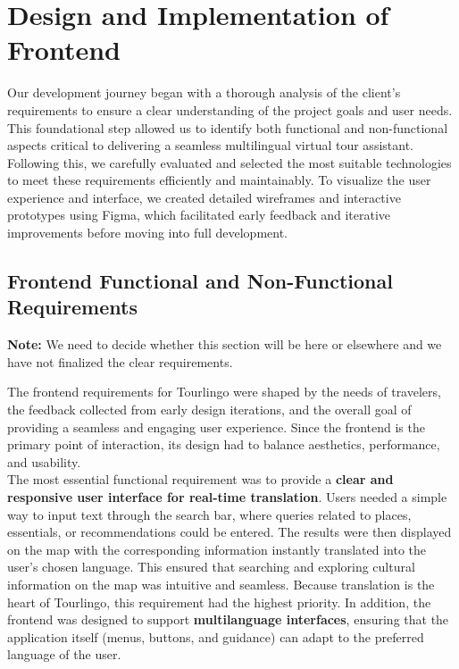 \section{Design and Implementation of Frontend}

Our development journey began with a thorough analysis of the client’s requirements to ensure a clear understanding of the project goals and user needs. This foundational step allowed us to identify both functional and non-functional aspects critical to delivering a seamless multilingual virtual tour assistant. Following this, we carefully evaluated and selected the most suitable technologies to meet these requirements efficiently and maintainably. To visualize the user experience and interface, we created detailed wireframes and interactive prototypes using Figma, which facilitated early feedback and iterative improvements before moving into full development.

\subsection{Frontend Functional and Non-Functional Requirements}

\textbf{Note:} We need to decide whether this section will be here or elsewhere and we have not finalized the clear requirements.

The frontend requirements for Tourlingo were shaped by the needs of travelers, the feedback collected from early design iterations, and the overall goal of providing a seamless and engaging user experience. Since the frontend is the primary point of interaction, its design had to balance aesthetics, performance, and usability. \\ 

The most essential functional requirement was to provide a \textbf{clear and responsive user interface for real-time translation}. Users needed a simple way to input text through the search bar, where queries related to places, essentials, or recommendations could be entered. The results were then displayed on the map with the corresponding information instantly translated into the user’s chosen language. This ensured that searching and exploring cultural information on the map was intuitive and seamless. Because translation is the heart of Tourlingo, this requirement had the highest priority. In addition, the frontend was designed to support \textbf{multilanguage interfaces}, ensuring that the application itself (menus, buttons, and guidance) can adapt to the preferred language of the user.  \\

